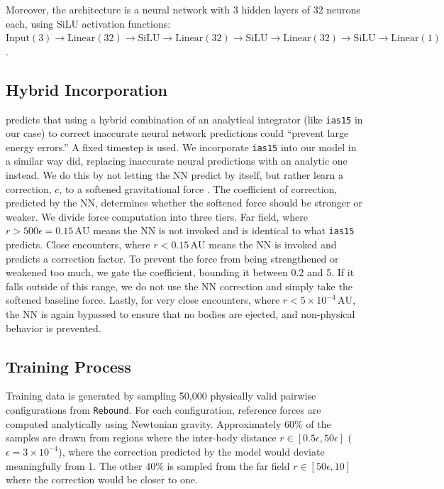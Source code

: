 \documentclass[12pt]{article}
\begin{document}
Moreover, the architecture is a neural network with 3 hidden layers of 32 neurons each, using SiLU activation functions:
$\mathrm{Input}(3) \to \mathrm{Linear}(32) \to \mathrm{SiLU} \to \mathrm{Linear}(32) \to \mathrm{SiLU} \to \mathrm{Linear}(32) \to \mathrm{SiLU} \to \mathrm{Linear}(1)$.

\subsection{Hybrid Incorporation}
\cite{ulibarrena2024hybrid} predicts that using a hybrid combination of an analytical integrator (like \texttt{ias15} in our case) to correct inaccurate neural network predictions could ``prevent large energy errors.'' A fixed timestep is used. We incorporate \texttt{ias15} into our model in a similar way \cite{ulibarrena2024hybrid} did, replacing inaccurate neural predictions with an analytic one instead. We do this by not letting the NN predict by itself, but rather learn a correction, $c$, to a softened gravitational force \cite{kipf2018neural}. The coefficient of correction, predicted by the NN, determines whether the softened force should be stronger or weaker. We divide force computation into three tiers. Far field, where $r > 500\epsilon = 0.15\,\mathrm{AU}$ means the NN is not invoked and is identical to what \texttt{ias15} predicts. Close encounters, where $r < 0.15\,\mathrm{AU}$ means the NN is invoked and predicts a correction factor. To prevent the force from being strengthened or weakened too much, we gate the coefficient, bounding it between 0.2 and 5. If it falls outside of this range, we do not use the NN correction and simply take the softened baseline force. Lastly, for very close encounters, where $r < 5\times10^{-4}\,\mathrm{AU}$, the NN is again bypassed to ensure that no bodies are ejected, and non-physical behavior is prevented.


\subsection{Training Process}
\label{sec:training}
Training data is generated by sampling 50,000 physically valid pairwise configurations from \texttt{Rebound}. For each configuration, reference forces are computed analytically using Newtonian gravity. Approximately $60\%$ of the samples are drawn from regions where the inter-body distance $r\in [0.5 \epsilon, 50 \epsilon]$ ($\epsilon = 3 \times10^{-4}$), where the correction predicted by the model would deviate meaningfully from 1. The other $40\%$ is sampled from the far field $r\in[50\epsilon, 10]$ where the correction would be closer to one.
\end{document}
